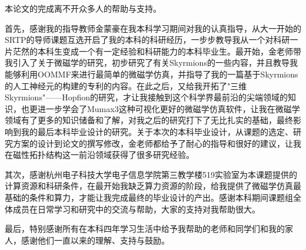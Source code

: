 \begin{acknowledgements}

本论文的完成离不开众多人的帮助与支持。

首先，感谢我的指导教师金蒙豪在我本科学习期间对我的认真指导，从大一开始的SRTP的导师课题互选开启了我的本科的科研经历，一步步教导我从一个对科研一片茫然的本科生变成一个有一定经验和科研能力的本科毕业生。最开始，金老师带我引入了关于微磁学的研究，初步研究了有关Skyrmions的一些内容，并且教导我能够利用OOMMF来进行最简单的微磁学仿真，并指导了我的一篇基于Skyrmions的人工神经元的构建的专利的内容。在此之后，又给我开拓了"三维Skyrmions"——Hopfion的研究，才让我接触到这个科学界最前沿的尖端领域的知识，也更进一步学会了Mumax3这种可视化更好的微磁学仿真软件，让我在微磁学领域有了更多的知识储备和了解，对我之后的研究打下了无比扎实的基础，最终影响到我的最后本科毕业设计的研究。关于本次的本科毕业设计，从课题的选定、研究方案的设计到论文的撰写修改，金老师都给予了耐心的指导和很好的建议，让我在磁性拓扑结构这一前沿领域获得了很多研究经验。

其次，感谢杭州电子科技大学电子信息学院第三教学楼519实验室为本课题提供的计算资源和科研条件，在最开始我缺乏算力资源的阶段，给我提供了微磁学仿真最基础的条件和算力，才能让我完成最终的毕业设计的产出。感谢本科期间课题组全体成员在日常学习和研究中的交流与帮助，大家的支持对我帮助很大。

最后，特别感谢所有在本科四年学习生活中给予我帮助的老师和同学们和我的家人，感谢他们一直以来的理解、支持与鼓励。

\end{acknowledgements}
